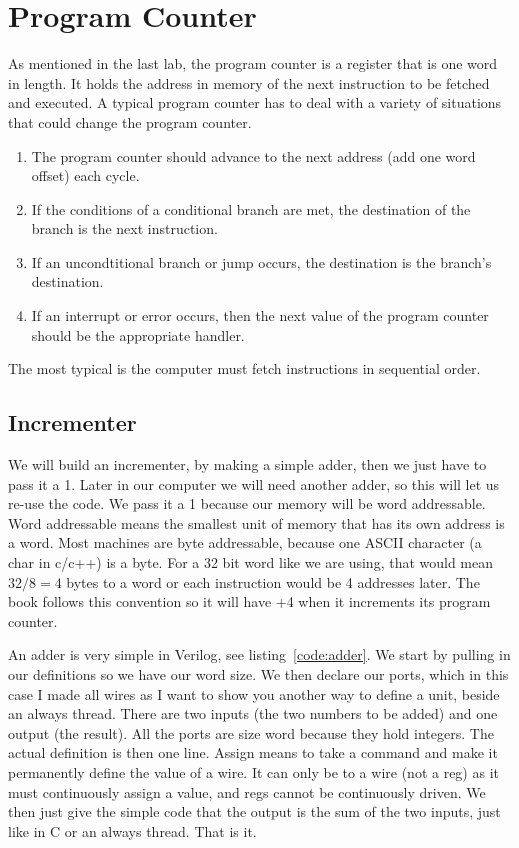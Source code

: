\chapter{Program Counter}

As mentioned in the last lab, the program counter is a register that is one word in length.  It holds the address in memory of the next instruction to be fetched and executed.  A typical program counter has to deal with a variety of situations that could change the program counter.  
\begin{enumerate}
\item The program counter should advance to the next address (add one word offset) each cycle.
\item If the conditions of a conditional branch are met, the destination of the branch is the next instruction.
\item If an uncondtitional branch or jump occurs, the destination is the branch's destination.
\item If an interrupt or error occurs, then the next value of the program counter should be the appropriate handler.
\end{enumerate}
The most typical is the computer must fetch instructions in sequential order.

\section{Incrementer}

We will build an incrementer, by making a simple adder, then we just have to pass it a 1.  Later in our computer we will need another adder, so this will let us re-use the code.  We pass it a 1 because our memory will be word addressable.  Word addressable means the smallest unit of memory that has its own address is a word.  Most machines are byte addressable, because one ASCII character (a char in c/c++) is a byte.  For a 32 bit word like we are using, that would mean $32/8=4$ bytes to a word or each instruction would be 4 addresses later.  The book follows this convention so it will have +4 when it increments its program counter.

An adder is very simple in Verilog, see listing~\ref{code:adder}.  We start by pulling in our definitions so we have our word size.  We then declare our ports, which in this case I made all wires as I want to show you another way to define a unit, beside an always thread.  There are two inputs (the two numbers to be added) and one output (the result).   All the ports are size word because they hold integers.  The actual definition is then one line.  Assign means to take a command and make it permanently define the value of a wire.  It can only be to a wire (not a reg) as it must continuously assign a value, and regs cannot be continuously driven.  We then just give the simple code that the output is the sum of the two inputs, just like in C or an always thread.  That is it.

